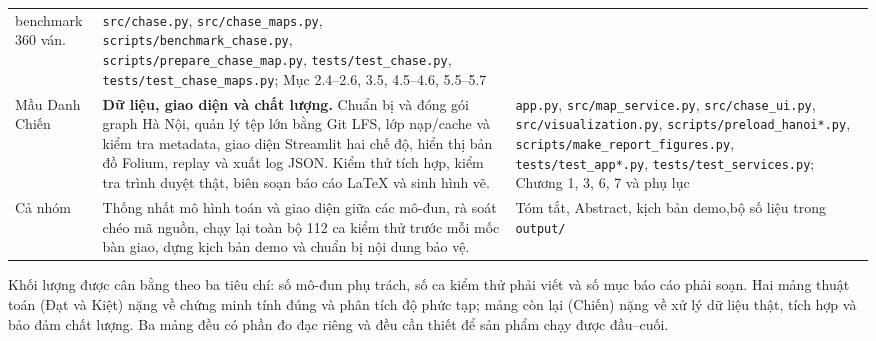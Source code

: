 \begin{longtable}{>{\raggedright\arraybackslash}p{2.8cm}>{\raggedright\arraybackslash}p{5.75cm}p{6.15cm}}
benchmark 360 ván.
&
\texttt{src/chase.py},\newline
\texttt{src/chase\_maps.py},\newline
\texttt{scripts/benchmark\_chase.py},\newline
\texttt{scripts/prepare\_chase\_map.py},\newline
\texttt{tests/test\_chase.py},\newline
\texttt{tests/test\_chase\_maps.py};\newline
Mục 2.4--2.6, 3.5, 4.5--4.6, 5.5--5.7 \\
\addlinespace
Mầu Danh Chiến\newline 23017270
&
\textbf{Dữ liệu, giao diện và chất lượng.} Chuẩn bị và đóng gói graph Hà Nội,
quản lý tệp lớn bằng Git LFS, lớp nạp/cache và kiểm tra metadata, giao diện
Streamlit hai chế độ, hiển thị bản đồ Folium, replay và xuất log JSON. Kiểm thử
tích hợp, kiểm tra trình duyệt thật, biên soạn báo cáo \LaTeX{} và sinh hình vẽ.
&
\texttt{app.py},\newline
\texttt{src/map\_service.py},\newline
\texttt{src/chase\_ui.py},\newline
\texttt{src/visualization.py},\newline
\texttt{scripts/preload\_hanoi*.py},\newline
\texttt{scripts/make\_report\_figures.py},\newline
\texttt{tests/test\_app*.py},\newline
\texttt{tests/test\_services.py};\newline
Chương 1, 3, 6, 7 và phụ lục \\
\addlinespace
\midrule
Cả nhóm
&
Thống nhất mô hình toán và giao diện giữa các mô-đun, rà soát chéo mã nguồn,
chạy lại toàn bộ 112 ca kiểm thử trước mỗi mốc bàn giao, dựng kịch bản demo và
chuẩn bị nội dung bảo vệ.
&
Tóm tắt, Abstract, kịch bản demo,\newline bộ số liệu trong \texttt{output/} \\
\bottomrule
\end{longtable}
\normalsize

Khối lượng được cân bằng theo ba tiêu chí: số mô-đun phụ trách, số ca kiểm thử
phải viết và số mục báo cáo phải soạn. Hai mảng thuật toán (Đạt và Kiệt) nặng về
chứng minh tính đúng và phân tích độ phức tạp; mảng còn lại (Chiến) nặng về xử lý
dữ liệu thật, tích hợp và bảo đảm chất lượng. Ba mảng đều có phần đo đạc riêng và
đều cần thiết để sản phẩm chạy được đầu--cuối.
\clearpage
